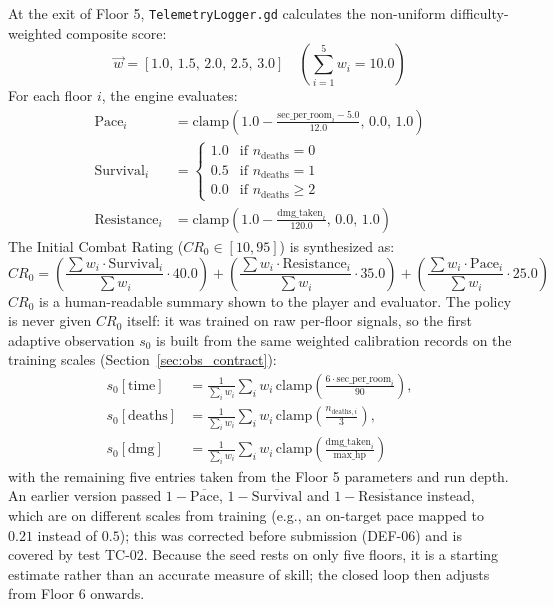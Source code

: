 At the exit of Floor 5, \texttt{TelemetryLogger.gd} calculates the non-uniform difficulty-weighted composite score:
\begin{equation}
\vec{w} = [1.0, \, 1.5, \, 2.0, \, 2.5, \, 3.0] \quad \left(\sum_{i=1}^5 w_i = 10.0\right)
\label{eq:weights}
\end{equation}
For each floor $i$, the engine evaluates:
\begin{align}
\text{Pace}_i &= \text{clamp}\left(1.0 - \frac{\text{sec\_per\_room}_i - 5.0}{12.0}, \, 0.0, \, 1.0\right) \\
\text{Survival}_i &= \begin{cases} 1.0 & \text{if } n_{\text{deaths}} = 0 \\ 0.5 & \text{if } n_{\text{deaths}} = 1 \\ 0.0 & \text{if } n_{\text{deaths}} \ge 2 \end{cases} \\
\text{Resistance}_i &= \text{clamp}\left(1.0 - \frac{\text{dmg\_taken}_i}{120.0}, \, 0.0, \, 1.0\right)
\end{align}
The Initial Combat Rating ($CR_0 \in [10, 95]$) is synthesized as:
\begin{equation}
CR_0 = \left(\frac{\sum w_i \cdot \text{Survival}_i}{\sum w_i} \cdot 40.0\right) + \left(\frac{\sum w_i \cdot \text{Resistance}_i}{\sum w_i} \cdot 35.0\right) + \left(\frac{\sum w_i \cdot \text{Pace}_i}{\sum w_i} \cdot 25.0\right)
\label{eq:cr0_formula}
\end{equation}
$CR_0$ is a human-readable summary shown to the player and evaluator. The policy is never given $CR_0$ itself: it was trained on raw per-floor signals, so the first adaptive observation $s_0$ is built from the same weighted calibration records on the training scales (Section~\ref{sec:obs_contract}):
\begin{equation}
\begin{aligned}
s_0[\text{time}] &= \frac{1}{\sum_i w_i}\sum_i w_i \, \text{clamp}\!\left(\frac{6\cdot\text{sec\_per\_room}_i}{90}\right),\\
s_0[\text{deaths}] &= \frac{1}{\sum_i w_i}\sum_i w_i \, \text{clamp}\!\left(\frac{n_{\text{deaths},i}}{3}\right),\\
s_0[\text{dmg}] &= \frac{1}{\sum_i w_i}\sum_i w_i \, \text{clamp}\!\left(\frac{\text{dmg\_taken}_i}{\text{max\_hp}}\right)
\end{aligned}
\label{eq:s0_seed}
\end{equation}
with the remaining five entries taken from the Floor 5 parameters and run depth. An earlier version passed $1-\overline{\text{Pace}}$, $1-\overline{\text{Survival}}$ and $1-\overline{\text{Resistance}}$ instead, which are on different scales from training (e.g., an on-target pace mapped to $0.21$ instead of $0.5$); this was corrected before submission (DEF-06) and is covered by test TC-02. Because the seed rests on only five floors, it is a starting estimate rather than an accurate measure of skill; the closed loop then adjusts from Floor 6 onwards.

